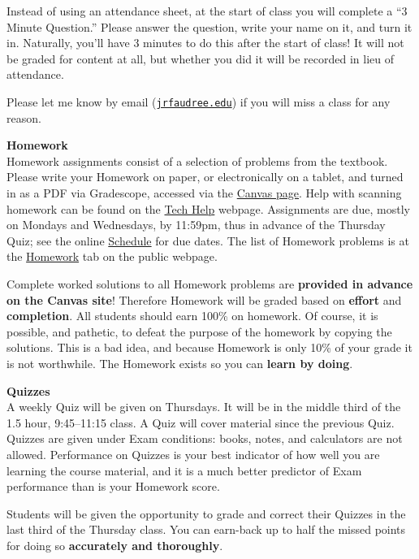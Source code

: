 \documentclass[12pt]{article}
\renewcommand{\emph}[1]{\textsf{\textbf{#1}}}
\newcommand{\localhead}[1]{\par\smallskip\textbf{#1} \smallskip\nobreak\\}%
\def\heading#1{\localhead{\large\emph{#1}}}
\begin{document}
Instead of using an attendance sheet, at the start of class you will complete a ``3 Minute Question.''  Please answer the question, write your name on it, and turn it in.  Naturally, you'll have 3 minutes to do this after the start of class!  It will not be graded for content at all, but whether you did it will be recorded in lieu of attendance.

Please let me know by email (\href{mailto:jrfaudree@alaska.edu}{\texttt{jrfaudree\@@alaska.edu}}) if you will miss a class for any reason.


\heading{Homework}
Homework assignments consist of a selection of problems from the textbook.  Please write your Homework on paper, or electronically on a tablet, and turned in as a PDF via Gradescope, accessed via the \href{https://canvas.alaska.edu/courses/16194}{Canvas page}.  Help with scanning homework can be found on the \href{https://uaf-math251.github.io/techHelp.html}{Tech Help} webpage.  Assignments are due, mostly on Mondays and Wednesdays, by 11:59pm, thus in advance of the Thursday Quiz; see the online  \href{https://docs.google.com/spreadsheets/d/e/2PACX-1vTJV11ILVouSFriJJQo6VS7-qBGvXBt6gtQNPTmmScJuiknursixGxHQf12yrBgwkJqETFn31EgQRia/pubhtml}{Schedule} for due dates.  The list of Homework problems is at the \href{https://uaf-math251.github.io/calc2/homework.html}{Homework} tab on the public webpage.

Complete worked solutions to all Homework problems are \emph{provided in advance on the Canvas site}!  Therefore Homework will be graded based on \emph{effort} and \emph{completion}.  All students should earn 100\% on homework.  Of course, it is possible, and pathetic, to defeat the purpose of the homework by copying the solutions.  This is a bad idea, and because Homework is only 10\% of your grade it is not worthwhile.  The Homework exists so you can \emph{learn by doing}.

\heading{Quizzes}
A weekly Quiz will be given on Thursdays.  It will be in the middle third of the 1.5 hour, 9:45--11:15 class.  A Quiz will cover material since the previous Quiz.  Quizzes are given under Exam conditions: books, notes, and calculators are not allowed.  Performance on Quizzes is your best indicator of how well you are learning the course material, and it is a much better predictor of Exam performance than is your Homework score.

Students will be given the opportunity to grade and correct their Quizzes in the last third of the Thursday class.  You can earn-back up to half the missed points for doing so \emph{accurately and thoroughly}.
\end{document}
